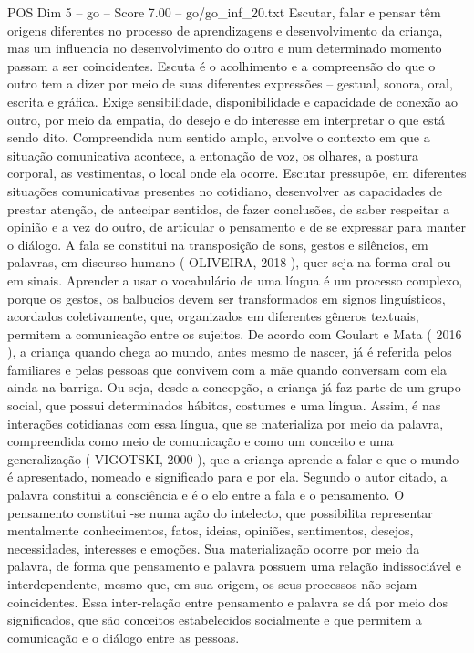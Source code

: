 \begin{textsample}{POS Dim 5 – go – Score 7.00 – go/go\_inf\_20.txt}
Escutar, falar e pensar têm origens diferentes no processo de aprendizagens e desenvolvimento da criança, mas um influencia no desenvolvimento do outro e num determinado momento passam a ser coincidentes.
Escuta é o acolhimento e a compreensão do que o outro tem a dizer por meio de suas diferentes expressões – gestual, sonora, oral, escrita e gráfica.
Exige sensibilidade, disponibilidade e capacidade de conexão ao outro, por meio da empatia, do desejo e do interesse em interpretar o que está sendo dito.
Compreendida num sentido amplo, envolve o contexto em que a situação comunicativa acontece, a entonação de voz, os olhares, a postura corporal, as vestimentas, o local onde ela ocorre.
Escutar pressupõe, em diferentes situações comunicativas presentes no cotidiano, desenvolver as capacidades de prestar atenção, de antecipar sentidos, de fazer conclusões, de saber respeitar a opinião e a vez do outro, de articular o pensamento e de se expressar para manter o diálogo.
A fala se constitui na transposição de sons, gestos e silêncios, em palavras, em discurso humano ( OLIVEIRA, 2018 ), quer seja na forma oral ou em sinais.
Aprender a usar o vocabulário de uma língua é um processo complexo, porque os gestos, os balbucios devem ser transformados em signos linguísticos, acordados coletivamente, que, organizados em diferentes gêneros textuais, permitem a comunicação entre os sujeitos.
De acordo com Goulart e Mata ( 2016 ), a criança quando chega ao mundo, antes mesmo de nascer, já é referida pelos familiares e pelas pessoas que convivem com a mãe quando conversam com ela ainda na barriga.
Ou seja, desde a concepção, a criança já faz parte de um grupo social, que possui determinados hábitos, costumes e uma língua.
Assim, é nas interações cotidianas com essa língua, que se materializa por meio da palavra, compreendida como meio de comunicação e como um conceito e uma generalização ( VIGOTSKI, 2000 ), que a criança aprende a falar e que o mundo é apresentado, nomeado e significado para e por ela.
Segundo o autor citado, a palavra constitui a consciência e é o elo entre a fala e o pensamento.
O pensamento constitui -se numa ação do intelecto, que possibilita representar mentalmente conhecimentos, fatos, ideias, opiniões, sentimentos, desejos, necessidades, interesses e emoções.
Sua materialização ocorre por meio da palavra, de forma que pensamento e palavra possuem uma relação indissociável e interdependente, mesmo que, em sua origem, os seus processos não sejam coincidentes.
Essa inter-relação entre pensamento e palavra se dá por meio dos significados, que são conceitos estabelecidos socialmente e que permitem a comunicação e o diálogo entre as pessoas.

\end{textsample}
